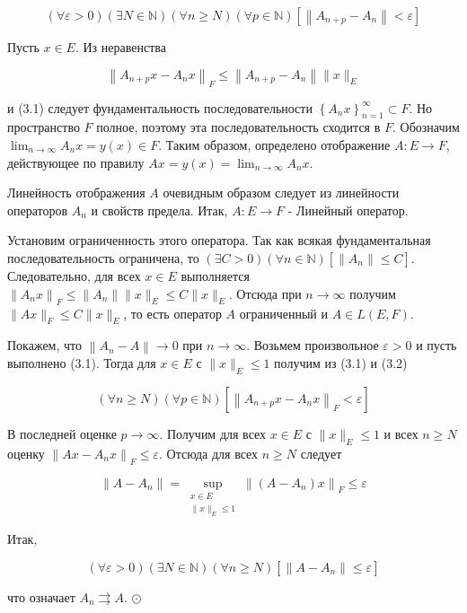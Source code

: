 $$
	(\forall \varepsilon>0)(\exists N \in \mathbb{N})(\forall n \geq N)(\forall p \in \mathbb{N})\left[\left\|A_{n+p}-A_{n}\right\|<\varepsilon\right]
$$

Пусть $x \in E$. Из неравенства

$$
	\left\|A_{n+p} x-A_{n} x\right\|_{F} \leq\left\|A_{n+p}-A_{n}\right\|\|x\|_{E}
$$

и (3.1) следует фундаментальность последовательности $\left\{A_{n} x\right\}_{n=1}^{\infty} \subset F$. Но пространство $F$ полное, поэтому эта последовательность сходится в $F$. Обозначим $\lim _{n \rightarrow \infty} A_{n} x=y(x) \in F$. Таким образом, определено отображение $A: E \rightarrow F$, действующее по правилу $A x=y(x)=\lim _{n \rightarrow \infty} A_{n} x$.

Линейность отображения $A$ очевидным образом следует из линейности операторов $A_{n}$ и свойств предела. Итак, $A: E \rightarrow F$ - Линейный оператор.

Установим ограниченность этого оператора. Так как всякая фундаментальная последовательность ограничена, то $(\exists C>0)(\forall n \in \mathbb{N})\left[\left\|A_{n}\right\| \leq C\right]$. Следовательно, для всех $x \in E$ выполняется $\left\|A_{n} x\right\|_{F} \leq\left\|A_{n}\right\|\|x\|_{E} \leq C\|x\|_{E}$. Отсюда при $n \rightarrow \infty$ получим $\|A x\|_{F} \leq C\|x\|_{E}$, то есть оператор $A$ ограниченный и $A \in L(E, F)$.

Покажем, что $\left\|A_{n}-A\right\| \rightarrow 0$ при $n \rightarrow \infty$. Возьмем произвольное $\varepsilon>0$ и пусть выполнено (3.1). Тогда для $x \in E$ с $\|x\|_{E} \leq 1$ получим из (3.1) и (3.2)

$$
	(\forall n \geq N)(\forall p \in \mathbb{N})\left[\left\|A_{n+p} x-A_{n} x\right\|_{F}<\varepsilon\right]
$$

В последней оценке $p \rightarrow \infty$. Получим для всех $x \in E$ с $\|x\|_{E} \leq 1$ и всех $n \geq N$ оценку $\left\|A x-A_{n} x\right\|_{F} \leq \varepsilon$. Отсюда для всех $n \geq N$ следует

$$
	\left\|A-A_{n}\right\|=\sup _{\substack{x \in E \\\|x\|_{E} \leq 1}}\left\|\left(A-A_{n}\right) x\right\|_{F} \leq \varepsilon
$$

Итак,

$$
	(\forall \varepsilon>0)(\exists N \in \mathbb{N})(\forall n \geq N)\left[\left\|A-A_{n}\right\| \leq \varepsilon\right]
$$

что означает $A_{n} \rightrightarrows A$. $\odot$


